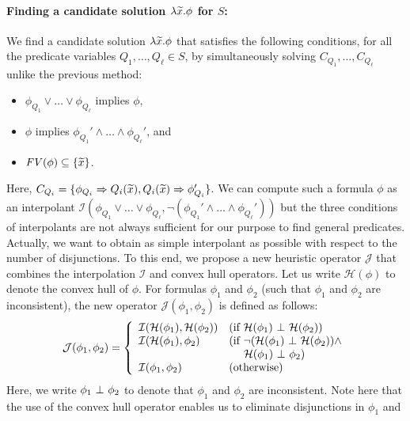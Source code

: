 \paragraph{Finding a candidate solution \(\lambda \widetilde{x}.\phi\) for \(S\):}
We find a candidate solution \(\lambda \widetilde{x}.\phi\) that satisfies the 
following conditions, for all the predicate variables 
\(Q_1,\dots,Q_{\ell} \in S\), by simultaneously solving 
\(C_{Q_1},\dots,C_{Q_{\ell}}\) unlike the previous method:
\begin{itemize}
\item \(\phi_{Q_1} \lor \dots \lor \phi_{Q_{\ell}}\) implies \(\phi\),
\item \(\phi\) implies \(\phi_{Q_1}' \land \dots \land \phi_{Q_{\ell}}'\), and
\item \(\mathit{FV}({\phi}) \subseteq \{{\widetilde{x}}\}\).
\end{itemize}
Here, \(C_{Q_i}=\{{\phi_{Q_i} \Rightarrow Q_i(\widetilde{x}),Q_i(\widetilde{x}) \Rightarrow 
\phi_{Q_i}'}\}\).  We can compute such a formula \(\phi\) as an 
interpolant \(\mathcal{I}(\phi_{Q_1} \lor \dots \lor 
\phi_{Q_{\ell}},\neg (\phi_{Q_1}' \land \dots \land \phi_{Q_{\ell}}'))\) 
but the three conditions of interpolants are not always sufficient for 
our purpose to find general predicates.  Actually, we want to obtain as 
simple interpolant as possible with respect to the number of 
disjunctions.
To this end, we propose a new heuristic operator \(\mathcal{J}\) that 
combines the interpolation \(\mathcal{I}\) and convex hull operators.  
Let us write \(\mathcal{H}(\phi)\) to denote the convex hull of \(\phi\). 
 For formulas \(\phi_1\) and \(\phi_2\) (such that \(\phi_1\) and 
\(\phi_2\) are inconsistent), the new operator 
\(\mathcal{J}(\phi_1,\phi_2)\) is defined as follows:
\[
\mathcal{J}(\phi_1,\phi_2) =
\left\{
\begin{array}{ll}
\mathcal{I}(\mathcal{H}(\phi_1),\mathcal{H}(\phi_2)) & (\mbox{if~}\mathcal{H}(\phi_1) \ \bot\  \mathcal{H}(\phi_2)) \\
\mathcal{I}(\mathcal{H}(\phi_1),\phi_2) & (\mbox{if~}\neg (\mathcal{H}(\phi_1) \ \bot\  \mathcal{H}(\phi_2)) \land \\
&\ \quad \mathcal{H}(\phi_1) \ \bot\  \phi_2) \\
\mathcal{I}(\phi_1,\phi_2) & (\mbox{otherwise})
\end{array}
\right.
\]
Here, we write \(\phi_1 \ \bot\  \phi_2\) to denote that \(\phi_1\) and 
\(\phi_2\) are inconsistent.  Note here that the use of the convex hull 
operator enables us to eliminate disjunctions in \(\phi_1\) and 
